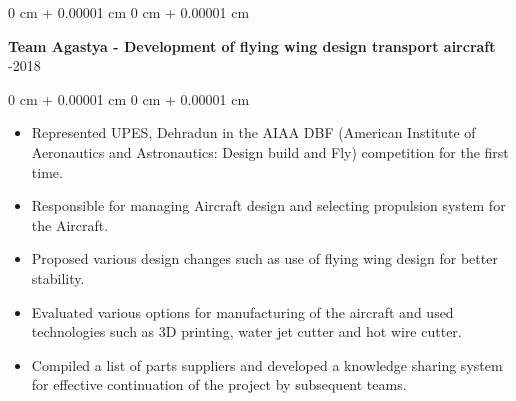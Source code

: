 \documentclass[10pt, letterpaper]{article}
\newenvironment{highlights}{
    \begin{itemize}[
        topsep=0.10 cm,
        parsep=0.10 cm,
        partopsep=0pt,
        itemsep=0pt,
        leftmargin=0 cm + 10pt
    ]
}{
    \end{itemize}
} %
\newenvironment{onecolentry}{
    \begin{adjustwidth}{
        0 cm + 0.00001 cm
    }{
        0 cm + 0.00001 cm
    }
}{
    \end{adjustwidth}
} %
\newenvironment{twocolentry}[2][]{
    \onecolentry
    \def\secondColumn{#2}
    \setcolumnwidth{\fill, 4.5 cm}
    \begin{paracol}{2}
}{
    \switchcolumn \raggedleft \secondColumn
    \end{paracol}
    \endonecolentry
} %
\begin{document}
        \vspace{0.2 cm}

        \begin{twocolentry}{
            2017-2018
        }
            \textbf{Team Agastya - Development of flying wing design transport aircraft}\end{twocolentry}

        \vspace{0.10 cm}
        \begin{onecolentry}
            \begin{highlights}
                \item	Represented UPES, Dehradun in the AIAA DBF (American Institute of Aeronautics and Astronautics: Design build and Fly) competition for the first time.
                \item	Responsible for managing Aircraft design and selecting propulsion system for the Aircraft.
                \item	Proposed various design changes such as use of flying wing design for better stability.
                \item	Evaluated various options for manufacturing of the aircraft and used technologies such as 3D printing, water jet cutter and hot wire cutter.
                \item	Compiled a list of parts suppliers and developed a knowledge sharing system for effective continuation of the project by subsequent teams.
                
            \end{highlights}
        \end{onecolentry}
    

\end{document}
